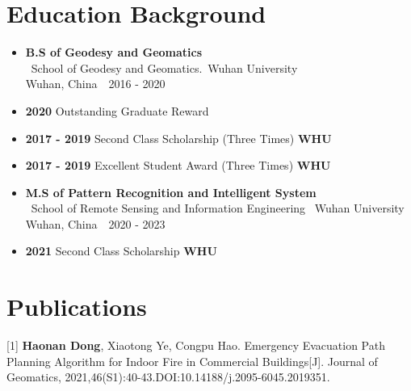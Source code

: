 \documentclass[a4paper]{article}
\begin{document}
\section{Education Background}
\begin{itemize}[itemsep = -0.5em,topsep = 0em]
    \item \textbf{B.S of Geodesy and Geomatics }
          \\\ School of Geodesy and Geomatics.\ Wuhan University\\ Wuhan, China\ \ 2016 - 2020
    \item \textbf{2020} \hspace{3.36cm} Outstanding Graduate Reward
    \item \textbf{2017 - 2019} \hspace{2cm} Second Class Scholarship (Three Times) \hspace{2cm} \textbf{WHU}
    \item \textbf{2017 - 2019} \hspace{2cm} Excellent Student Award (Three Times) \hspace{2cm} \textbf{WHU}
\end{itemize}

\begin{itemize}[itemsep = -0.5em,topsep = 0em]
    \item \textbf{M.S of Pattern Recognition and Intelligent System}
          \\\ School of Remote Sensing and Information Engineering \ Wuhan University\\ Wuhan, China\ \ 2020 - 2023
    \item \textbf{2021} \hspace{3.36cm} Second Class Scholarship \hspace{3.18cm} \textbf{WHU}
\end{itemize}

\section{Publications}
 [1] \textbf{Haonan Dong}, Xiaotong Ye, Congpu Hao. Emergency Evacuation Path Planning Algorithm for Indoor Fire in Commercial Buildings[J]. Journal of Geomatics, 2021,46(S1):40-43.DOI:10.14188/j.2095-6045.2019351.
\end{document}
